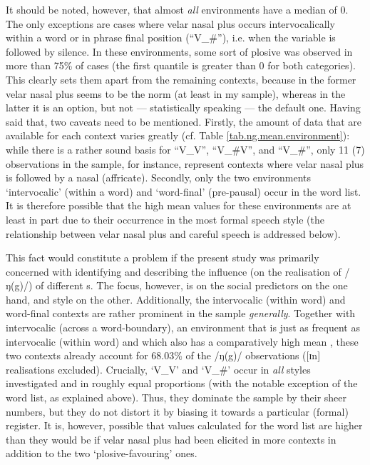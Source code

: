 It should be noted, however, that almost \emph{all} environments have a median  of 0.
The only exceptions are cases where velar nasal plus occurs intervocalically within a word or in phrase final position (``V\_\#''), i.e. when the variable is followed by silence.
In these environments, some sort of plosive was observed in more than 75\% of cases (the first quantile is greater than 0 for both categories).
This clearly sets them apart from the remaining contexts, because in the former velar nasal plus seems to be the norm (at least in my sample), whereas in the latter it is an option, but not --- statistically speaking --- the default one.
Having said that, two caveats need to be mentioned.
Firstly, the amount of data that are available for each context varies greatly (cf. Table \ref{tab.ng.mean.environment}): while there is a rather sound basis for ``V\_V'', ``V\_\#V'', and ``V\_\#'', only 11 (7) observations in the sample, for instance, represent contexts where velar nasal plus is followed by a nasal (affricate).
Secondly, only the two environments `intervocalic' (within a word) and `word-final' (pre-pausal) occur in the word list.
It is therefore possible that the high mean  values for these environments are at least in part due to their occurrence in the most formal speech style (the relationship between velar nasal plus and careful speech is addressed below).

This fact would constitute a problem if the present study was primarily concerned with identifying and describing the influence (on the realisation of /ŋ(g)/) of different s.
The focus, however, is on the social predictors on the one hand, and style on the other.
Additionally, the intervocalic (within word) and word-final contexts are rather prominent in the sample \emph{generally}.
Together with intervocalic (across a word-boundary), an environment that is just as frequent as intervocalic (within word) and which also has a comparatively high mean , these two contexts  already account for 68.03\% of the /ŋ(g)/ observations ([ɪn] realisations excluded).
Crucially, `V\_V' and `V\_\#' occur in \emph{all} styles investigated and in roughly equal proportions (with the notable exception of the word list, as explained above).
Thus, they dominate the sample by their sheer numbers, but they do not distort it by biasing it towards a particular (formal) register.
It is, however, possible that  values calculated for the word list are higher than they would be if velar nasal plus had been elicited in more contexts in addition to the two `plosive-favouring' ones.

